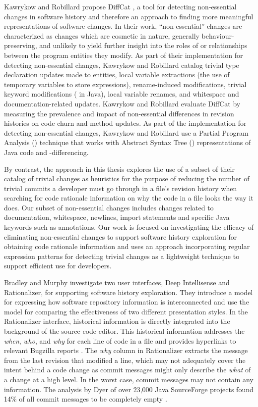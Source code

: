 Kawrykow and Robillard propose DiffCat \cite{kawrykow_non-essential_2011}, 
a tool for detecting non-essential changes in software history and therefore an approach to finding 
more meaningful representations of software changes.
In their work, ``non-essential'' changes are characterized as changes which are cosmetic in nature, 
generally behaviour-preserving, and unlikely to yield further insight into the roles of or 
relationships between the program entities they modify.
As part of their implementation for detecting non-essential changes, 
Kawrykow and Robillard catalog trivial type declaration updates made to entities,
local variable extractions (\ie the use of temporary variables to store expressions),
rename-induced modifications, trivial keyword modifications (\eg {} in Java), 
local variable renames, and whitespace and documentation-related updates.
Kawrykow and Robillard evaluate DiffCat by measuring the prevalence and
impact of non-essential differences in revision histories on code churn and method updates.
As part of the implementation for detecting non-essential changes, Kawrykow and Robillard use
a Partial Program Analysis () technique that works with Abstract Syntax Tree () representations of
Java code and -differencing.

By contrast, the approach in this thesis explores the use of a subset of their catalog of trivial changes
as heuristics for the purpose of reducing 
the number of trivial commits a developer must go through in a file's revision history when searching 
for code rationale information on why the code in a file looks the way it does.
Our subset of non-essential changes includes changes related to documentation, whitespace,
newlines, import statements and specific Java keywords such as annotations.
Our work is focused on investigating the efficacy of eliminating non-essential changes
to support software history exploration for obtaining code rationale information
and uses an approach incorporating regular expression patterns for detecting
trivial changes as a lightweight technique to support efficient use for developers.

Bradley and Murphy \cite{bradley_supporting_2011} investigate two user interfaces, Deep Intellisense and Rationalizer, 
for supporting software history exploration.
They introduce a model for expressing how software repository information is interconnected 
and use the model for comparing the effectiveness of two different presentation styles.
In the Rationalizer interface, historical information is directly integrated into the background of the source code editor.
This historical information addresses the \emph{when}, \emph{who}, and \emph{why} for each line of code in a file 
and provides hyperlinks to relevant Bugzilla reports \cite{bradley_supporting_2011}.
The \emph{why} column in Rationalizer extracts the message from the last revision that modified a line, 
which may not adequately cover the intent behind a code change as commit messages 
might only describe the \emph{what} of a change at a high level.
In the worst case, commit messages may not contain any information.
The analysis by Dyer \etal of over 23,000 Java SourceForge projects found 14\% of all 
commit messages to be completely empty \cite{dyer_boa_2013}.

